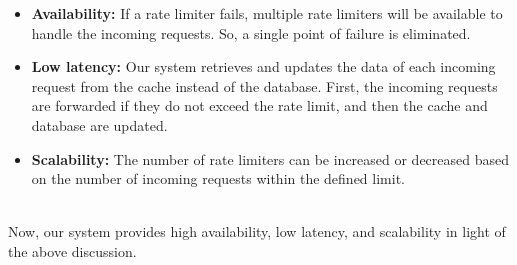 \begin{itemize}
\item
\protect{}\label{RZvcuT9UPu8wldABAjjqw}
\textbf{Availability:} If a rate limiter fails, multiple rate limiters will be available to handle the incoming requests. So, a single point of failure is eliminated.
\item
\protect{}\label{itDDg_5Gkas7C-reFyto8}
\textbf{Low latency:} Our system retrieves and updates the data of each incoming request from the cache instead of the database. First, the incoming requests are forwarded if they do not exceed the rate limit, and then the cache and database are updated.
\item
\protect{}\label{_Uxqb8o5hAvJCuCLRBaKa}
\textbf{Scalability:} The number of rate limiters can be increased or decreased based on the number of incoming requests within the defined limit.
\end{itemize}
\\
Now, our system provides high availability, low latency, and scalability in light of the above discussion.

